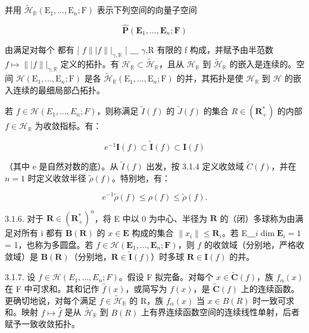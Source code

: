 并用 \(\tilde{\mathcal{H}}_{\mathbb{R}}(\mathrm{E}_{1},\ldots ,\mathrm{E}_{n};\mathrm{F})\) 表示下列空间的向量子空间

\[
\hat {\mathbf {P}} (\mathbf {E} _ {1}, \dots , \mathbf {E} _ {n}; \mathbf {F})
\]

由满足对每个  都有  | \(f\)\(\| | f \| | _ {\gamma,\mathbb{R}}\)  | ＿ \(\gamma\),R 有限的 f 构成，并赋予由半范数 \(f\mapsto\| | f \| | _ {\gamma,\mathbb{R}}\) 定义的拓扑。有 \(\mathcal{H}_{\mathbb{R}}\subset\tilde{\mathcal{H}}_{\mathbb{R}}\)，且从 \(\mathcal{H}_{\mathbb{R}}\) 到 \(\tilde{\mathcal{H}}_{\mathbb{R}}\) 的嵌入是连续的。空间 \(\mathcal{H}(\mathrm{E}_{1},\ldots,\mathrm{E}_{n};\mathrm{F})\) 是各 \(\tilde{\mathcal{H}}_{\mathbb{R}}(\mathrm{E}_{1},\ldots,\mathrm{E}_{n};\mathrm{F})\) 的并，其拓扑是使 \(\mathcal{H}_{\mathbb{R}}\) 到 \(\mathcal{H}\) 的嵌入连续的最细局部凸拓扑。

若 \(f \in \mathcal{H}(E_1, \ldots, E_n; F)\)，则称满足 \(\tilde{I}(f)\) 的 \(\tilde{J}(f)\) 的集合 \(R \in (\mathbf{R}_+^*)\) 的内部 \(f \in \mathcal{H}_{\mathbb{R}}\) 为收敛指标。有：

\[
e ^ {- 1} \mathbf {I} (f) \subset \tilde{\mathbf {I}} (f) \subset \mathbf {I} (f)
\]

（其中 e 是自然对数的底）。从 \(\tilde{I}(f)\) 出发，按 3.1.4 定义收敛域 \(\tilde{C}(f)\)，并在 \(n = 1\) 时定义收敛半径 \(\tilde{\rho}(f)\)。特别地，有：

\[
e ^ {- 1} \tilde {\rho} (f) \leqslant \rho (f) \leqslant \tilde {\rho} (f).
\]

3.1.6. 对于 \(\mathbf{R} \in (\mathbf{R}_{+}^{*})^{n}\)，将 E 中以 0 为中心、半径为 \(\mathbf{R}\) 的（闭）多球称为由满足对所有 i 都有 \(\mathbf{B}(\mathbf{R})\) 的 \(x \in \mathbf{E}\) 构成的集合 \(\|x_{i}\| \leqslant \mathbf{R}_{i}\)。若  E＿\(i\)\(\dim \mathbf{E}_{i} = 1\) = 1，也称为多圆盘。若 \(f \in \mathcal{H}(\mathbf{E}_{1}, \ldots, \mathbf{E}_{n}; \mathbf{F})\)，则 \(f\) 的收敛域（分别地，严格收敛域）是 \(\mathbf{B}(\mathbf{R})\)（分别地，\(\mathbf{R} \in \tilde{\mathbf{I}}(f)\)）时多球 \(\mathbf{R} \in \mathbf{I}(f)\) 的并。

3.1.7. 设 \(f \in \mathcal{H}(E_1, \ldots, E_n; F)\)。假设 F 拟完备。对每个 \(x \in \tilde{\mathbf{C}}(f)\)，族 \(f_{\alpha}(x)\) 在 F 中可求和。其和记作 \(\hat{f}(x)\)，或简写为 \(f(x)\)，是 \(\tilde{\mathbf{C}}(f)\) 上的连续函数。更确切地说，对每个满足 \(f \in \tilde{\mathcal{H}}_{\mathbb{R}}\) 的 R，族 \(f_{\alpha}(x)\) 当 \(x \in B(R)\) 时一致可求和。映射 \(f \mapsto \hat{f}\) 是从 \(\tilde{\mathcal{H}}_{\mathbb{R}}\) 到 \(B(R)\) 上有界连续函数空间的连续线性单射，后者赋予一致收敛拓扑。

